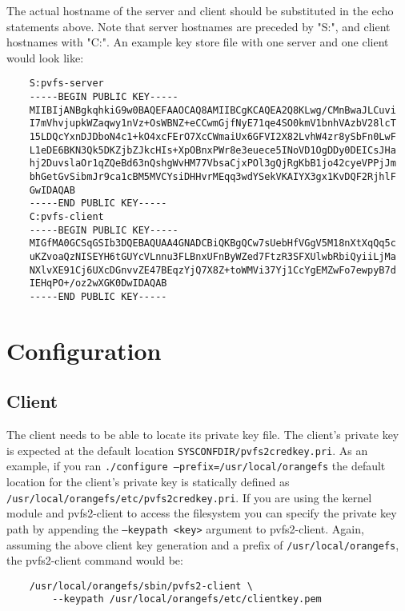\documentclass[11pt, letterpaper]{article}
\begin{document}
The actual hostname of the server and client should be substituted in the echo 
statements above. Note that server hostnames are preceded by "S:", and client 
hostnames with "C:". An example key store file with one server and one client 
would look like:

\begin{verbatim}
    S:pvfs-server
    -----BEGIN PUBLIC KEY-----
    MIIBIjANBgkqhkiG9w0BAQEFAAOCAQ8AMIIBCgKCAQEA2Q8KLwg/CMnBwaJLCuvi
    I7mVhvjupkWZaqwy1nVz+OsWBNZ+eCCwmGjfNyE71qe4SO0kmV1bnhVAzbV28lcT
    15LDQcYxnDJDboN4c1+kO4xcFErO7XcCWmaiUx6GFVI2X82LvhW4zr8ySbFn0LwF
    L1eDE6BKN3Qk5DKZjbZJkcHIs+XpOBnxPWr8e3euece5INoVD1OgDDy0DEICsJHa
    hj2DuvslaOr1qZQeBd63nQshgWvHM77VbsaCjxPOl3gQjRgKbB1jo42cyeVPPjJm
    bhGetGvSibmJr9ca1cBM5MVCYsiDHHvrMEqq3wdYSekVKAIYX3gx1KvDQF2RjhlF
    GwIDAQAB
    -----END PUBLIC KEY-----
    C:pvfs-client
    -----BEGIN PUBLIC KEY-----
    MIGfMA0GCSqGSIb3DQEBAQUAA4GNADCBiQKBgQCw7sUebHfVGgV5M18nXtXqQq5c
    uKZvoaQzNISEYH6tGUYcVLnnu3FLBnxUFnByWZed7FtzR3SFXUlwbRbiQyiiLjMa
    NXlvXE91Cj6UXcDGnvvZE47BEqzYjQ7X8Z+toWMVi37Yj1CcYgEMZwFo7ewpyB7d
    IEHqPO+/oz2wXGK0DwIDAQAB
    -----END PUBLIC KEY-----
\end{verbatim}

\section{Configuration}

\subsection{Client}
The client needs to be able to locate its private key file. The client's 
private key is expected at the default location 
\texttt{SYSCONFDIR/pvfs2credkey.pri}. As an example, if you ran 
\texttt{./configure --prefix=/usr/local/orangefs} the default location for the 
client's private key is statically defined as 
\texttt{/usr/local/orangefs/etc/pvfs2credkey.pri}. If you are using the kernel 
module and pvfs2-client to access the filesystem you can specify the private 
key path by appending the \texttt{--keypath <key>} argument to pvfs2-client. 
Again, assuming the above client key generation and a prefix of 
\texttt{/usr/local/orangefs}, the pvfs2-client command would be:

\begin{verbatim}
    /usr/local/orangefs/sbin/pvfs2-client \
        --keypath /usr/local/orangefs/etc/clientkey.pem
\end{verbatim}
\end{document}
